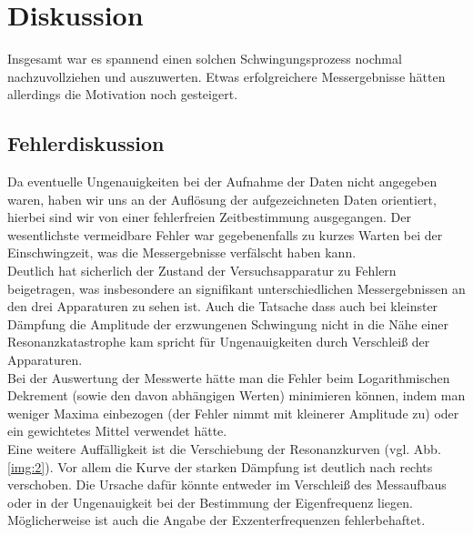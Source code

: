 \section{Diskussion}
Insgesamt war es spannend einen solchen Schwingungsprozess nochmal nachzuvollziehen und auszuwerten. Etwas erfolgreichere
Messergebnisse hätten allerdings die Motivation noch gesteigert.

\subsection{Fehlerdiskussion}
Da eventuelle Ungenauigkeiten bei der Aufnahme der Daten nicht angegeben waren, haben wir uns an der Auflösung 
der aufgezeichneten Daten orientiert, hierbei sind wir von einer \glqq fehlerfreien \grqq{} Zeitbestimmung 
ausgegangen. 
Der wesentlichste vermeidbare Fehler war gegebenenfalls zu kurzes Warten bei der Einschwingzeit, was
die Messergebnisse verfälscht haben kann. \\
Deutlich hat sicherlich der Zustand der Versuchsapparatur zu Fehlern beigetragen, was insbesondere an signifikant 
unterschiedlichen Messergebnissen an den drei Apparaturen zu sehen ist.
Auch die Tatsache dass auch bei kleinster Dämpfung die Amplitude der erzwungenen Schwingung nicht in die Nähe einer 
Resonanzkatastrophe kam spricht für Ungenauigkeiten durch Verschleiß der Apparaturen. \\
Bei der Auswertung der Messwerte hätte man die Fehler beim Logarithmischen Dekrement (sowie den davon abhängigen Werten) minimieren können, indem man weniger Maxima einbezogen (der Fehler nimmt mit kleinerer Amplitude zu) oder ein gewichtetes Mittel verwendet hätte. \\
Eine weitere Auffälligkeit ist die Verschiebung der Resonanzkurven (vgl. Abb. \ref{img:2}). Vor allem die Kurve der starken Dämpfung ist deutlich nach rechts verschoben. Die Ursache dafür könnte entweder im Verschleiß des Messaufbaus oder in der Ungenauigkeit bei der Bestimmung der Eigenfrequenz liegen. Möglicherweise ist auch die Angabe der Exzenterfrequenzen fehlerbehaftet.